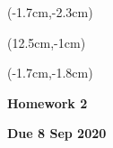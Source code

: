 \documentclass[12pt, oneside]{article}
\begin{document}
\begin{textblock*}{4cm}(-1.7cm,-2.3cm)
\end{textblock*}

\begin{textblock*}{8cm}(12.5cm,-1cm)
\end{textblock*}
\begin{textblock*}{13.5cm}(-1.7cm,-1.8cm)
\end{textblock*}

\vspace{1cm}

\begin{center}
\textbf{\Large Homework 2}

\textbf{Due 8 Sep 2020}
\end{center}
\end{document}
